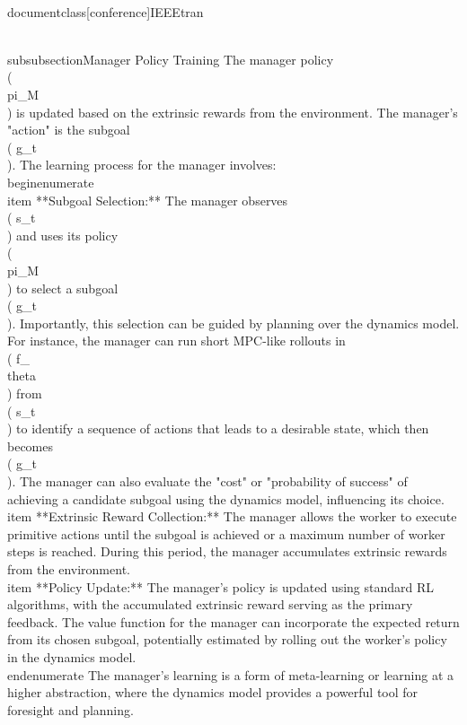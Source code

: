 \\documentclass[conference]{IEEEtran}
\begin{document}
\\subsubsection{Manager Policy Training}
The manager policy \\( \\pi_M \\) is updated based on the extrinsic rewards from the environment. The manager's "action" is the subgoal \\( g_t \\). The learning process for the manager involves:
\\begin{enumerate}
    \\item **Subgoal Selection:** The manager observes \\( s_t \\) and uses its policy \\( \\pi_M \\) to select a subgoal \\( g_t \\). Importantly, this selection can be guided by planning over the dynamics model. For instance, the manager can run short MPC-like rollouts in \\( f_\\theta \\) from \\( s_t \\) to identify a sequence of actions that leads to a desirable state, which then becomes \\( g_t \\). The manager can also evaluate the "cost" or "probability of success" of achieving a candidate subgoal using the dynamics model, influencing its choice.
    \\item **Extrinsic Reward Collection:** The manager allows the worker to execute primitive actions until the subgoal is achieved or a maximum number of worker steps is reached. During this period, the manager accumulates extrinsic rewards from the environment.
    \\item **Policy Update:** The manager's policy is updated using standard RL algorithms, with the accumulated extrinsic reward serving as the primary feedback. The value function for the manager can incorporate the expected return from its chosen subgoal, potentially estimated by rolling out the worker's policy in the dynamics model.
\\end{enumerate}
The manager's learning is a form of meta-learning or learning at a higher abstraction, where the dynamics model provides a powerful tool for foresight and planning.
\end{document}
